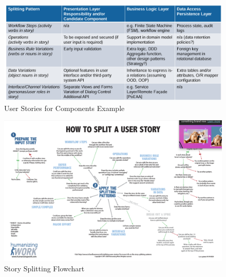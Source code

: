 \documentclass[../Main.tex]{subfiles}
\begin{document}
\begin{figure}[H]
    \centering
    \includegraphics[width=1\linewidth]{Images/user-stories-components.png}
    \caption{User Stories for Components Example}
\end{figure}
\newpage
\begin{figure}[H]
    \centering
    \includegraphics[angle=90,height=1\textwidth]{Images/storysplitting.png}
    \caption{Story Splitting Flowchart}
\end{figure}
\newpage
\end{document}
